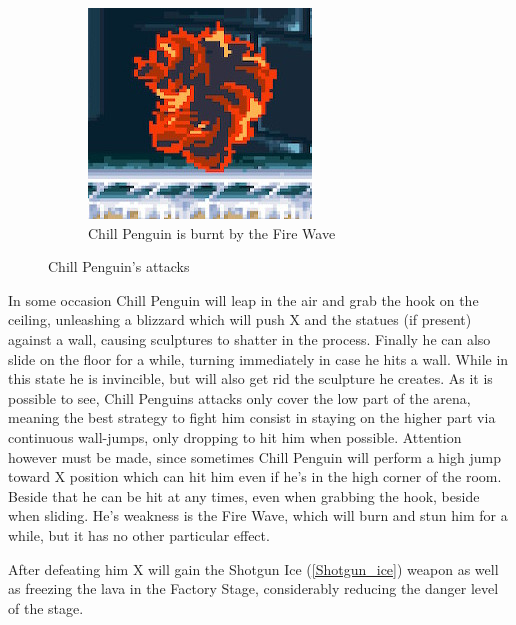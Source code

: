\begin{figure}[htp]
\begin{subfigure}[t]{0.35\textwidth}
		\includegraphics[width=\linewidth]{figures/X1/Chill_penguin/Chill_burn.jpg}
		\caption{Chill Penguin is burnt by the Fire Wave}
	\end{subfigure}
	\caption{Chill Penguin's attacks}
\end{figure}
In some occasion Chill Penguin will leap in the air and grab the hook on the ceiling, unleashing a blizzard which will push X and the statues (if present) against a wall, causing sculptures to shatter in the process. Finally he can also slide on the floor for a while, turning immediately in case he hits a wall. While in this state he is invincible, but will also get rid the sculpture he creates.  As it is possible to see, Chill Penguins attacks only cover the low part of the arena, meaning the best strategy to fight him consist in staying on the higher part via continuous wall-jumps, only dropping to hit him when possible. Attention however must be made, since sometimes Chill Penguin will perform a high jump toward X position which can hit him even if he's  in the high corner of the room. Beside that he can be hit at any times, even when grabbing the hook, beside when sliding. He's weakness is the Fire Wave, which will burn and stun him for a while, but it has no other particular effect.

After defeating him X will gain the Shotgun Ice (\ref{Shotgun_ice}) weapon as well as freezing the lava in the Factory Stage, considerably reducing the danger level of the stage.


